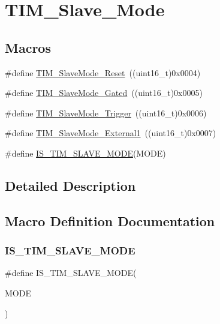\hypertarget{group___t_i_m___slave___mode}{}\section{T\+I\+M\+\_\+\+Slave\+\_\+\+Mode}
\label{group___t_i_m___slave___mode}
\subsection*{Macros}
\begin{DoxyCompactItemize}
\item 
\#define \mbox{\hyperlink{group___t_i_m___slave___mode_gaac1cec731f1a5e680a038c4f472f74af}{T\+I\+M\+\_\+\+Slave\+Mode\+\_\+\+Reset}}~((uint16\+\_\+t)0x0004)
\item 
\#define \mbox{\hyperlink{group___t_i_m___slave___mode_ga1f36c870b926f70b32f274bbc0bc39a5}{T\+I\+M\+\_\+\+Slave\+Mode\+\_\+\+Gated}}~((uint16\+\_\+t)0x0005)
\item 
\#define \mbox{\hyperlink{group___t_i_m___slave___mode_ga9e7726c04ee1bafec97226f08adf5677}{T\+I\+M\+\_\+\+Slave\+Mode\+\_\+\+Trigger}}~((uint16\+\_\+t)0x0006)
\item 
\#define \mbox{\hyperlink{group___t_i_m___slave___mode_ga34427a693157ab177fead9871185bd35}{T\+I\+M\+\_\+\+Slave\+Mode\+\_\+\+External1}}~((uint16\+\_\+t)0x0007)
\item 
\#define \mbox{\hyperlink{group___t_i_m___slave___mode_ga7f0e666bc968c56df7f1f6c2465c89fb}{I\+S\+\_\+\+T\+I\+M\+\_\+\+S\+L\+A\+V\+E\+\_\+\+M\+O\+DE}}(M\+O\+DE)
\end{DoxyCompactItemize}


\subsection{Detailed Description}


\subsection{Macro Definition Documentation}
\mbox{\label{group___t_i_m___slave___mode_ga7f0e666bc968c56df7f1f6c2465c89fb}} 
\subsubsection{\texorpdfstring{IS\_TIM\_SLAVE\_MODE}{IS\_TIM\_SLAVE\_MODE}}
{\footnotesize\ttfamily \#define I\+S\+\_\+\+T\+I\+M\+\_\+\+S\+L\+A\+V\+E\+\_\+\+M\+O\+DE(\begin{DoxyParamCaption}\item[{}]{M\+O\+DE }\end{DoxyParamCaption})}

